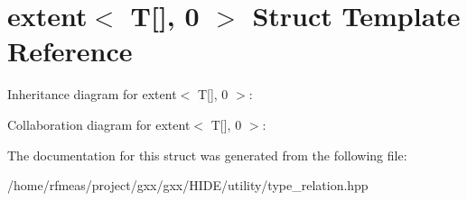 \hypertarget{structextent_3_01T[]_00_010_01_4}{}\section{extent$<$ T\mbox{[}\mbox{]}, 0 $>$ Struct Template Reference}
\label{structextent_3_01T[]_00_010_01_4}


Inheritance diagram for extent$<$ T\mbox{[}\mbox{]}, 0 $>$\+:


Collaboration diagram for extent$<$ T\mbox{[}\mbox{]}, 0 $>$\+:


The documentation for this struct was generated from the following file\+:\begin{DoxyCompactItemize}
\item 
/home/rfmeas/project/gxx/gxx/\+H\+I\+D\+E/utility/type\+\_\+relation.\+hpp\end{DoxyCompactItemize}
